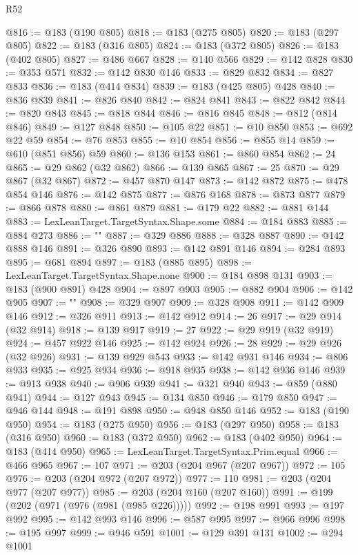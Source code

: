 \begin{lexlean}{R52}
\begin{coremodule}
@816 := @183 (@190 @805)
@818 := @183 (@275 @805)
@820 := @183 (@297 @805)
@822 := @183 (@316 @805)
@824 := @183 (@372 @805)
@826 := @183 (@402 @805)
@827 := @486 @667
@828 := @140 @566
@829 := @142 @828
@830 := @353 @571
@832 := @142 @830 @146
@833 := @829 @832
@834 := @827 @833
@836 := @183 (@414 @834)
@839 := @183 (@425 @805) @428
@840 := @836 @839
@841 := @826 @840
@842 := @824 @841
@843 := @822 @842
@844 := @820 @843
@845 := @818 @844
@846 := @816 @845
@848 := @812 (@814 @846)
@849 := @127 @848
@850 := @105 @22
@851 := @10 @850
@853 := @692 @22 @59
@854 := @76 @853
@855 := @10 @854
@856 := @855 @14
@859 := @610 (@851 @856) @59
@860 := @136 @153
@861 := @860 @854
@862 := 24
@865 := @29 @862 (@32 @862)
@866 := @139 @865
@867 := 25
@870 := @29 @867 (@32 @867)
@872 := @457 @870 @147
@873 := @142 @872
@875 := @478 @854 @146
@876 := @142 @875
@877 := @876 @168
@878 := @873 @877
@879 := @866 @878
@880 := @861 @879
@881 := @179 @22
@882 := @881 @144
@883 := LexLeanTarget.TargetSyntax.Shape.some
@884 := @184 @883
@885 := @884 @273
@886 := "{"
@887 := @329 @886
@888 := @328 @887
@890 := @142 @888 @146
@891 := @326 @890
@893 := @142 @891 @146
@894 := @284 @893
@895 := @681 @894
@897 := @183 (@885 @895)
@898 := LexLeanTarget.TargetSyntax.Shape.none
@900 := @184 @898 @131
@903 := @183 (@900 @891) @428
@904 := @897 @903
@905 := @882 @904
@906 := @142 @905
@907 := "}"
@908 := @329 @907
@909 := @328 @908
@911 := @142 @909 @146
@912 := @326 @911
@913 := @142 @912
@914 := 26
@917 := @29 @914 (@32 @914)
@918 := @139 @917
@919 := 27
@922 := @29 @919 (@32 @919)
@924 := @457 @922 @146
@925 := @142 @924
@926 := 28
@929 := @29 @926 (@32 @926)
@931 := @139 @929 @543
@933 := @142 @931 @146
@934 := @806 @933
@935 := @925 @934
@936 := @918 @935
@938 := @142 @936 @146
@939 := @913 @938
@940 := @906 @939
@941 := @321 @940
@943 := @859 (@880 @941)
@944 := @127 @943
@945 := @134 @850
@946 := @179 @850
@947 := @946 @144
@948 := @191 @898
@950 := @948 @850 @146
@952 := @183 (@190 @950)
@954 := @183 (@275 @950)
@956 := @183 (@297 @950)
@958 := @183 (@316 @950)
@960 := @183 (@372 @950)
@962 := @183 (@402 @950)
@964 := @183 (@414 @950)
@965 := LexLeanTarget.TargetSyntax.Prim.equal
@966 := @466 @965
@967 := 107
@971 := @203 (@204 @967 (@207 @967))
@972 := 105
@976 := @203 (@204 @972 (@207 @972))
@977 := 110
@981 := @203 (@204 @977 (@207 @977))
@985 := @203 (@204 @160 (@207 @160))
@991 := @199 (@202 (@971 (@976 (@981 (@985 @226)))))
@992 := @198 @991
@993 := @197 @992
@995 := @142 @993 @146
@996 := @587 @995
@997 := @966 @996
@998 := @195 @997
@999 := @946 @591
@1001 := @129 @391 @131
@1002 := @294 @1001

\end{coremodule}
\end{lexlean}
